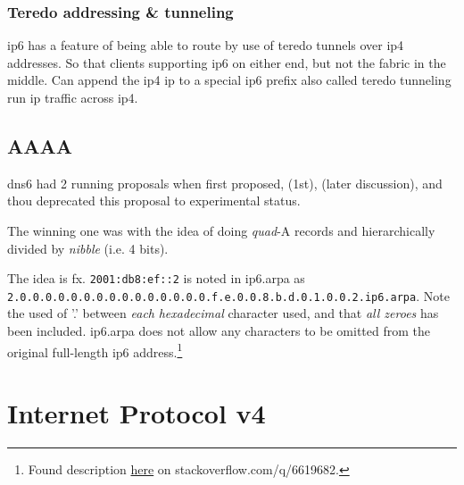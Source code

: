 \subsubsection[Teredo]{Teredo addressing \& tunneling}

ip6 has a feature of being able to route by use of teredo tunnels over ip4 addresses. So that clients supporting ip6 on either end, but not the fabric in the middle. Can append the ip4 ip to a special ip6 prefix also called teredo tunneling run ip traffic across ip4.

\subsection{AAAA}

\gls{dns6} had 2 running proposals when first proposed,  (1st),  (later discussion), and  thou deprecated this proposal to experimental status.

The winning one was  with the idea of doing \textit{quad}-A records and hierarchically divided by \textit{nibble} {\small (i.e. 4 bits)}.

The idea is fx. \texttt{2001:db8:ef::2} is noted in ip6.arpa as \texttt{2.0.0.0.0.0.0.0.0.0.0.0.0.0.0.0.f.e.0.0.8.b.d.0.1.0.0.2.ip6.arpa}. {\small Note the used of '.' between \textit{each} \textit{hexadecimal} character used, and that \textit{all zeroes} has been included. ip6.arpa does not allow any characters to be omitted from the original full-length \gls{ip6} address.}\footnote{Found description \href{https://stackoverflow.com/q/6619682}{here} on stackoverflow.com/q/6619682.}

\section[IPv4]{Internet Protocol v4}